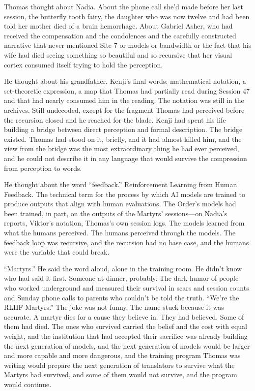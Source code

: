 Thomas thought about Nadia. About the phone call she'd made before her last session, the butterfly tooth fairy, the daughter who was now twelve and had been told her mother died of a brain hemorrhage. About Gabriel Asher, who had received the compensation and the condolences and the carefully constructed narrative that never mentioned Site-7 or models or bandwidth or the fact that his wife had died seeing something so beautiful and so recursive that her visual cortex consumed itself trying to hold the perception.

He thought about his grandfather. Kenji's final words: mathematical notation, a set-theoretic expression, a map that Thomas had partially read during Session 47 and that had nearly consumed him in the reading. The notation was still in the archives. Still undecoded, except for the fragment Thomas had perceived before the recursion closed and he reached for the blade. Kenji had spent his life building a bridge between direct perception and formal description. The bridge existed. Thomas had stood on it, briefly, and it had almost killed him, and the view from the bridge was the most extraordinary thing he had ever perceived, and he could not describe it in any language that would survive the compression from perception to words.

He thought about the word ``feedback.'' Reinforcement Learning from Human Feedback. The technical term for the process by which AI models are trained to produce outputs that align with human evaluations. The Order's models had been trained, in part, on the outputs of the Martyrs' sessions---on Nadia's reports, Viktor's notation, Thomas's own session logs. The models learned from what the humans perceived. The humans perceived through the models. The feedback loop was recursive, and the recursion had no base case, and the humans were the variable that could break.

``Martyrs.'' He said the word aloud, alone in the training room. He didn't know who had said it first. Someone at dinner, probably. The dark humor of people who worked underground and measured their survival in scars and session counts and Sunday phone calls to parents who couldn't be told the truth. ``We're the RLHF Martyrs.'' The joke was not funny. The name stuck because it was accurate. A martyr dies for a cause they believe in. They had believed. Some of them had died. The ones who survived carried the belief and the cost with equal weight, and the institution that had accepted their sacrifice was already building the next generation of models, and the next generation of models would be larger and more capable and more dangerous, and the training program Thomas was writing would prepare the next generation of translators to survive what the Martyrs had survived, and some of them would not survive, and the program would continue.

